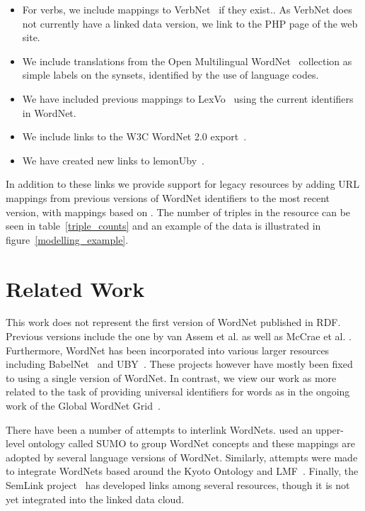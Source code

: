 \documentclass[10pt, a4paper]{article}
\begin{document}
\begin{itemize}
  \item For verbs, we include mappings to VerbNet~\cite{schuler2005verbnet} if they exist.. As
    VerbNet does not currently have a linked data version, we link to the
    PHP page of the web site.
  \item We include translations from the Open Multilingual WordNet~\cite{bond2013linking}
    collection as simple labels on the synsets, identified by the use of
    language codes.
  \item We have included previous mappings to LexVo~\cite{de2008language} 
    using the current identifiers in WordNet.
  \item We include links to the W3C WordNet 2.0 export~\cite{van2006conversion}.
  \item We have created new links to lemonUby~\cite{eckle2014lemonuby}.
\end{itemize}

In addition to these links we provide support for legacy resources by
adding URL mappings from previous versions of WordNet identifiers to the most
recent version, with mappings based on \cite{daude2000mapping}. The number of
triples in the resource can be seen in table~\ref{triple_counts} and an example
of the data is illustrated in figure~\ref{modelling_example}.

\section{Related Work}

This work does not represent the first version of WordNet published in RDF. Previous versions
include the one by van Assem et al. \cite{van2006conversion} as well as McCrae et al. \cite{mccrae2012integrating}. Furthermore, WordNet has been
incorporated into various larger resources including
BabelNet~\cite{navigli2010babelnet,ehrmann2014} and 
UBY~\cite{gurevych2012uby,eckle2014lemonuby}. These projects however have mostly
been fixed to using a single version of WordNet. In contrast, we view our work
as more related to the task of providing universal identifiers for words as in the
ongoing work of the Global WordNet Grid~\cite{pease2008building}.  

There have been a number of attempts to interlink WordNets. 
\cite{pease2009formal} used an upper-level ontology called SUMO to group WordNet
concepts and these mappings are adopted by several language versions of WordNet.
Similarly, attempts were made to integrate WordNets based around the Kyoto
Ontology and LMF~\cite{soria2009wordnet}. Finally, the SemLink
project~\cite{palmer2009semlink} has
developed links among several resources, though it is not yet integrated into
the linked data cloud.
\end{document}
